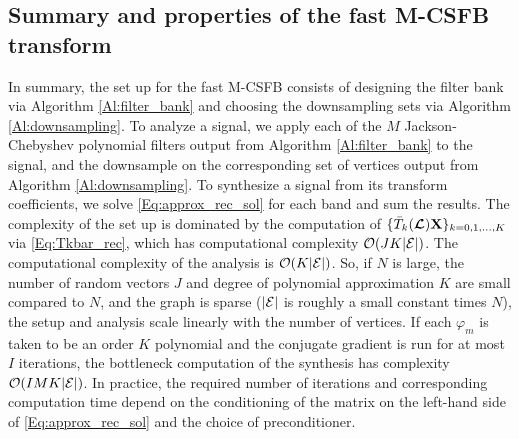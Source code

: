 \documentclass[journal, 10pt]{IEEEtran}
\begin{document}



\subsection{Summary and properties of the fast M-CSFB transform} \label{Se:fast_prop}
In summary, the set up for the fast M-CSFB consists of designing the filter bank via Algorithm \ref{Al:filter_bank} and choosing the downsampling sets via Algorithm \ref{Al:downsampling}. To analyze a signal, we apply each of the $M$ Jackson-Chebyshev polynomial filters output from Algorithm \ref{Al:filter_bank} to the signal, and the downsample on the corresponding set of vertices output from Algorithm \ref{Al:downsampling}. To synthesize a signal from its transform coefficients, we solve \eqref{Eq:approx_rec_sol} for each band and sum the results. The complexity of the set up is dominated by the computation of $\{\bar{T}_k(\boldsymbol{\mathcal{L}}){\bf X}\}_{k=0,1,\ldots,K}$  via \eqref{Eq:Tkbar_rec}, which has computational complexity ${\cal O}(JK|\E|)$. The computational complexity of the analysis is ${\cal O}(K|\E|)$. So, if $N$ is large, the number of random vectors $J$ and degree of polynomial approximation $K$ are small compared to $N$, and the graph is sparse ($|{\mathcal{E}}|$ is roughly a small constant times $N$), the setup and analysis scale linearly with the number of vertices. If each $\varphi_m$ is taken to be an order $K$ polynomial and the conjugate gradient is run for at most $I$ iterations, the bottleneck computation of the synthesis has complexity ${\cal O}(IMK|\E|)$. In practice, the required number of iterations and corresponding computation time depend on the conditioning of the matrix on the left-hand side of \eqref{Eq:approx_rec_sol} and the choice of preconditioner. %
\end{document}
